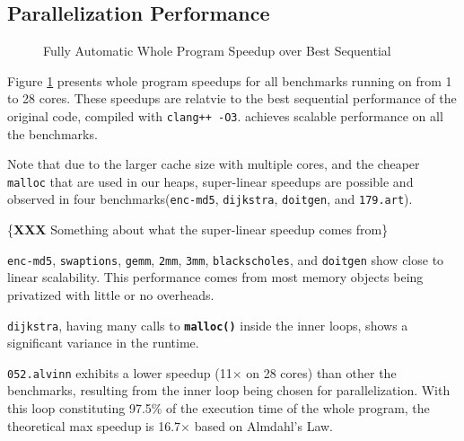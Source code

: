 \subsection{Parallelization Performance}

\begin{figure}[ht]
  \centering
  \caption{Fully Automatic Whole Program Speedup over Best Sequential}
  \label{fig:multi-core-scale}
\end{figure}

Figure \ref{fig:multi-core-scale} presents whole program speedups for
all benchmarks running on from 1 to 28 cores. These speedups are
relatvie to the best sequential performance of the original code, compiled
with \texttt{clang++ -O3}. \name achieves scalable performance on all the
benchmarks.

Note that due to the larger cache size with multiple cores,  and the
cheaper \texttt{malloc} that are used in our heaps, super-linear speedups
are possible and observed in four benchmarks(\texttt{enc-md5},
\texttt{dijkstra}, \texttt{doitgen}, and \texttt{179.art}).

\{\textbf{XXX} Something about what the super-linear speedup comes from\}

\texttt{enc-md5}, \texttt{swaptions}, \texttt{gemm}, \texttt{2mm},
\texttt{3mm}, \texttt{blackscholes}, and \texttt{doitgen} show
close to linear scalability. This performance comes from most memory
objects being privatized with little or no overheads.

\texttt{dijkstra}, having many calls to \texttt{\textbf{malloc()}}
inside the inner loops, shows a significant variance in
the runtime.

\texttt{052.alvinn} exhibits a lower speedup (11$\times$ on 28
cores) than other the benchmarks, resulting from the inner loop
being chosen for parallelization. With this loop constituting 97.5\% of the
execution time of the whole program, the theoretical max speedup is 16.7$\times$
based on Almdahl's Law.

